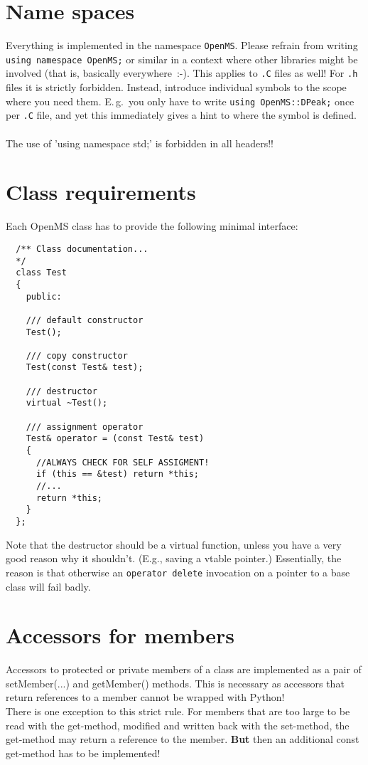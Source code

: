 \documentclass[a4]{article}
\begin{document}
\section{Name spaces}

Everything is implemented in the namespace \texttt{OpenMS}.  Please refrain
from writing \texttt{using namespace OpenMS;} or similar in a context where
other libraries might be involved (that is, basically everywhere~:-).  This
applies to \texttt{.C} files as well!  For \texttt{.h} files it is strictly
forbidden.  Instead, introduce individual symbols to the scope where you need
them.  E.\,g.\ you only have to write \texttt{using OpenMS::DPeak;} once per
\texttt{.C} file, and yet this immediately gives a hint to where the symbol is
defined.\\
\\
The use of 'using namespace std;' is forbidden in all headers!!


\section{Class requirements}

Each OpenMS class has to provide the following minimal interface:
\begin{verbatim}
  /** Class documentation... 
  */
  class Test
  {
    public:

    /// default constructor
    Test();

    /// copy constructor 
    Test(const Test& test);

    /// destructor 
    virtual ~Test();
 
    /// assignment operator
    Test& operator = (const Test& test)
    {
      //ALWAYS CHECK FOR SELF ASSIGMENT!
      if (this == &test) return *this;
      //...
      return *this;
    }
  };
\end{verbatim}
Note that the destructor should be a virtual function, unless you have a very
good reason why it shouldn't.  (E.g., saving a vtable pointer.)  Essentially,
the reason is that otherwise an \texttt{operator delete} invocation on a
pointer to a base class will fail badly.

\section{Accessors for members}
Accessors to protected or private members of a class are implemented as a pair
of setMember(...) and getMember() methods.
This is necessary as accessors that return references to a member cannot be wrapped with Python!\\
There is one exception to this strict rule. For members that are too large to be
read with the get-method, modified and written back with the set-method, the
get-method may return a reference to the member. {\bf But} then an additional const
get-method has to be implemented! 
\end{document}
